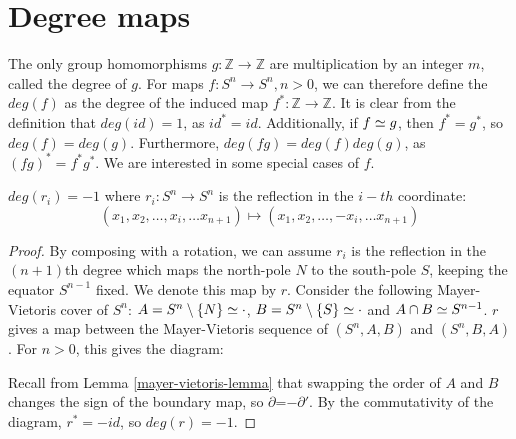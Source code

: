 \section{Degree maps}\label{sec-degree-maps}
The only group homomorphisms $g: \mathbb{Z} \rightarrow \mathbb{Z}$ are multiplication by an integer $m$, called the degree of $g$. For maps $f:S^n\rightarrow S^n,n>0$, we can therefore define the  $deg(f)$ as the degree of the induced map $f^*: \mathbb{Z}\rightarrow \mathbb{Z}$. It is clear from the definition that $deg(id)=1$, as $id^*=id$. Additionally, if $f\simeq g$, then $f^*=g^*$, so $deg(f)=deg(g)$. Furthermore, $deg(fg)=deg(f)deg(g)$, as $(fg)^*=f^*g^*$. We are interested in some special cases of $f$.

\begin{proposition}
$deg(r_i)=-1$ where $r_i:S^n\rightarrow S^n$ is the reflection in the $i-th$ coordinate:
$$(x_1,x_2,\dots,x_i,\dots x_{n+1})\mapsto (x_1,x_2,\dots,-x_i,\dots x_{n+1})$$
\end{proposition}
\begin{proof}
By composing with a rotation, we can assume $r_i$ is the reflection in the $(n+1)$th degree which maps the north-pole $N$ to the south-pole $S$, keeping the equator $S^{n-1}$ fixed. We denote this map by $r$. Consider the following Mayer-Vietoris cover of $S^n$:  $A=S^n\setminus\{N\}\simeq \cdot$, $B=S^n\setminus\{S\}\simeq \cdot$ and $A\cap B \simeq S^{n-1}$. $r$ gives a map between the Mayer-Vietoris sequence of $(S^n,A,B)$ and $(S^n,B,A)$. For $n>0$, this gives the diagram:


Recall from Lemma \ref{mayer-vietoris-lemma} that swapping the order of $A$ and $B$ changes the sign of the boundary map, so $\partial$=$-\partial'$. By the commutativity of the diagram, $r^*=-id$, so $deg(r)=-1$.

\end{proof}


